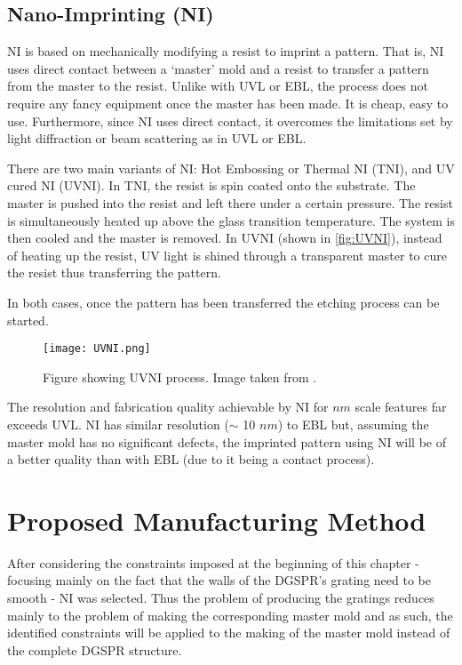 \subsection{Nano-Imprinting (NI)}

NI is based on mechanically modifying a resist to imprint a pattern. That is, NI uses direct contact between a `master' mold and a resist to transfer a pattern from the master to the resist. Unlike with UVL or EBL, the process does not require any fancy equipment once the master has been made. It is cheap, easy to use. Furthermore, since NI uses direct contact, it overcomes the limitations set by light diffraction or beam scattering as in UVL or EBL. 

There are two main variants of NI: Hot Embossing or Thermal NI (TNI), and UV cured NI (UVNI). In TNI, the resist is spin coated onto the substrate. The master is pushed into the resist and left there under a certain pressure. The resist is simultaneously heated up above the glass transition temperature. The system is then cooled and the master is removed. In UVNI (shown in \autoref{fig:UVNI}), instead of heating up the resist, UV light is shined through a transparent master to cure the resist thus transferring the pattern. 

In both cases, once the pattern has been transferred the etching process can be started. 

\begin{figure}
\centering
\texttt{[image: UVNI.png]}
\caption{Figure showing UVNI process. Image taken from \cite{UVNI_paper}.}
\label{fig:UVNI}
\end{figure}

The resolution and fabrication quality achievable by NI for $nm$ scale features far exceeds UVL. NI has similar resolution ($\sim$ 10 $nm$) to EBL but, assuming the master mold has no significant defects, the imprinted pattern using NI will be of a better quality than with EBL (due to it being a contact process). 

\section{Proposed Manufacturing Method}
After considering the constraints imposed at the beginning of this chapter - focusing mainly on the fact that the walls of the DGSPR's grating need to be smooth - NI was selected. Thus the problem of producing the gratings reduces mainly to the problem of making the corresponding master mold and as such, the identified constraints will be applied to the making of the master mold instead of the complete DGSPR structure. 

